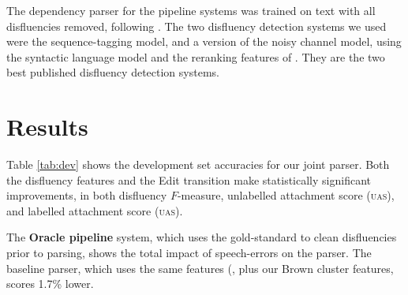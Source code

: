 \documentclass[11pt,letterpaper]{article}
\begin{document}
The dependency parser for the pipeline systems was trained on text with all disfluencies
removed, following \citet{Charniak01a}. 
The two disfluency detection systems we used were the \citet{qian:13} sequence-tagging
model, and a version of the \citet{Johnson04a} noisy channel model, using the
\citet{Charniak01b} syntactic language model and the reranking features of
\citet{zwarts:11}. They are the two best published disfluency detection systems.




\section{Results}
\label{sec:results}

Table \ref{tab:dev} shows the development set accuracies for our joint parser.
Both the disfluency features and the 
Edit transition make statistically significant improvements, in both
disfluency $F$-measure, unlabelled attachment score (\textsc{uas}), and
labelled attachment score (\textsc{uas}).

The \textbf{Oracle pipeline} system, which uses the gold-standard to clean disfluencies
prior to parsing, shows the total impact of speech-errors on the parser.  The
baseline parser, which uses the same features (\citet{zhang:11}, plus our Brown
cluster features, scores 1.7\% lower. 
\end{document}
